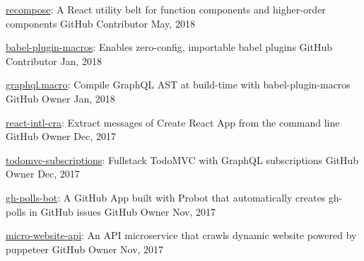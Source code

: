 \begin{cvhonors}

  \cvhonor
    {\href{https://github.com/acdlite/recompose}{recompose}: \textmd{A React utility belt for function components and higher-order components}} %
    {GitHub} %
    {Contributor} %
    {May, 2018} %

  \cvhonor
    {\href{https://github.com/kentcdodds/babel-plugin-macros}{babel-plugin-macros}: \textmd{Enables zero-config, importable babel plugins}} %
    {GitHub} %
    {Contributor} %
    {Jan, 2018} %

  \cvhonor
    {\href{https://github.com/evenchange4/graphql.macro}{graphql.macro}: \textmd{Compile GraphQL AST at build-time with babel-plugin-macros}}
    {GitHub} %
    {Owner} %
    {Jan, 2018} %

  \cvhonor
    {\href{https://github.com/evenchange4/react-intl-cra}{react-intl-cra}: \textmd{Extract messages of Create React App from the command line}}
    {GitHub} %
    {Owner} %
    {Dec, 2017} %

  \cvhonor
    {\href{https://github.com/evenchange4/todomvc-subscriptions}{todomvc-subscriptions}: \textmd{Fullstack TodoMVC with GraphQL subscriptions}}
    {GitHub} %
    {Owner} %
    {Dec, 2017} %

  \cvhonor
    {\href{https://github.com/evenchange4/gh-polls-bot}{gh-polls-bot}: \textmd{A GitHub App built with Probot that automatically creates gh-polls in GitHub issues}}
    {GitHub} %
    {Owner} %
    {Nov, 2017} %

  \cvhonor
    {\href{https://github.com/evenchange4/micro-website-api}{micro-website-api}: \textmd{An API microservice that crawls dynamic website powered by puppeteer}}
    {GitHub} %
    {Owner} %
    {Nov, 2017} %


\end{cvhonors}
